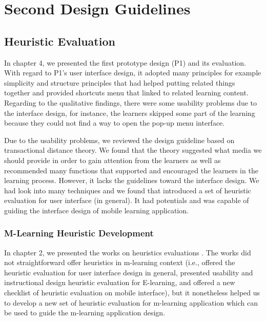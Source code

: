 \chapter{Second Design Guidelines}

\section{Heuristic Evaluation}

In chapter 4, we presented the first prototype design (P1) and its evaluation. With regard to P1's user interface design, it adopted many principles for example simplicity and structure principles that had helped putting related things together and provided shortcuts menu that linked to related learning content. Regarding to the qualitative findings, there were some usability problems due to the interface design, for instance, the learners skipped some part of the learning because they could not find a way to open the pop-up menu interface. 

Due to the usability problems, we reviewed the design guideline based on transactional distance theory. We found that the theory suggested what media we should provide in order to gain attention from the learners as well as recommended many functions that supported and encouraged the learners in the learning process. However, it lacks the guidelines toward the interface design. We had look into many techniques and we found \cite{nielsen1990heuristic} that introduced a set of heuristic evaluation for user interface (in general). It had potentials and was capable of guiding the interface design of mobile learning application. 

\subsection{M-Learning Heuristic Development} 

In chapter 2, we presented the works on heuristics evaluations \cite{nielsen199510, yanez2014heuristic, reeves2002usability}. The works did not straightforward offer heuristics in m-learning context (i.e., \cite{nielsen199510} offered the heuristic evaluation for user interface design in general, \cite{reeves2002usability} presented usability and instructional design heuristic evaluation for E-learning, and \cite{yanez2014heuristic} offered a new checklist of heuristic evaluation on mobile interface), but it nonetheless helped us to develop a new set of heuristic evaluation for m-learning application which can be used to guide the m-learning application design. 

